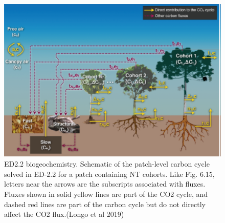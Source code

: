 \documentclass[12pt,oneside]{book}
\begin{document}
\begin{figure}

{\centering \includegraphics[width=0.8\linewidth]{figures/chap6/f617_ED_biogeochemistry} 

}

\caption{ ED2.2 biogeochemistry. Schematic of the patch-level carbon cycle solved in ED-2.2 for a patch containing NT cohorts. Like Fig. 6.15, letters near the arrows are the subscripts associated with fluxes. Fluxes shown in solid yellow lines are part of the CO2 cycle, and dashed red lines are part of the carbon cycle but do not directly affect the CO2 flux.(Longo et al 2019)}\label{fig:f617}
\end{figure}
\end{document}
